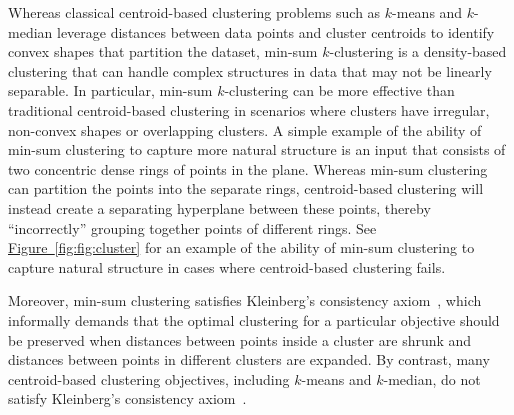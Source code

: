 \documentclass[10pt,a4paper]{amsart}
\newcommand{\namedref}[2]{\hyperref[#2]{#1~\ref*{#2}}}
\newcommand{\figref}[1]{\namedref{Figure}{fig:#1}}
\begin{document}
Whereas classical centroid-based clustering problems such as $k$-means and $k$-median leverage distances between data points and cluster centroids to identify convex shapes that partition the dataset, min-sum $k$-clustering is a density-based clustering that can handle complex structures in data that may not be linearly separable. 
In particular, min-sum $k$-clustering can be more effective than traditional centroid-based clustering in scenarios where clusters have irregular, non-convex shapes or overlapping clusters.
A simple example of the ability of min-sum clustering to capture more natural structure is an input that consists of two concentric dense rings of points in the plane. 
Whereas min-sum clustering can partition the points into the separate rings, centroid-based clustering will instead create a separating hyperplane between these points, thereby ``incorrectly'' grouping together points of different rings. 
See \figref{fig:cluster} for an example of the ability of min-sum clustering to capture natural structure in cases where centroid-based clustering fails. 

Moreover, min-sum clustering satisfies Kleinberg\textquoteright{}s consistency axiom~\cite{Kleinberg02}, which informally demands that the optimal clustering for a particular objective should be preserved when distances between points inside a cluster are shrunk and distances between points in different clusters are expanded. 
By contrast, many centroid-based clustering objectives, including $k$-means and $k$-median, do not satisfy Kleinberg's consistency axiom~\cite{MahajanNV12}. 
\end{document}
